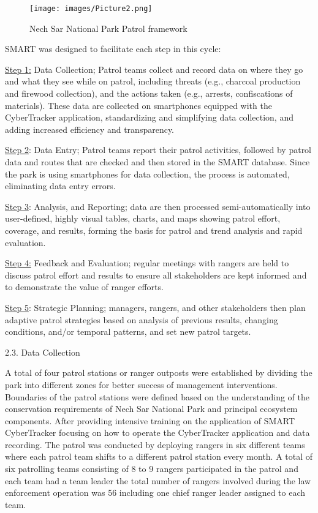 \documentclass[
  letterpaper,
  DIV=11,
  numbers=noendperiod]{scrartcl}
\begin{document}
\begin{figure}[H]

{\centering \texttt{[image: images/Picture2.png]}

}

\caption{Nech Sar National Park Patrol framework}

\end{figure}%

SMART was designed to facilitate each step in this cycle:~

\ul{Step 1:} Data Collection; Patrol teams collect and record data on
where they go and what they see while on patrol, including threats
(e.g., charcoal production and firewood collection), and the actions
taken (e.g., arrests, confiscations of materials). These data are
collected on smartphones equipped with the CyberTracker application,
standardizing and simplifying data collection, and adding increased
efficiency and transparency.~

\ul{Step 2}: Data Entry; Patrol teams report their patrol activities,
followed by patrol data and routes that are checked and then stored in
the SMART database. Since the park is using smartphones for data
collection, the process is automated, eliminating data entry errors.

\ul{Step 3}: Analysis, and Reporting; data are then processed
semi-automatically into user-defined, highly visual tables, charts, and
maps showing patrol effort, coverage, and results, forming the basis for
patrol and trend analysis and rapid evaluation.

\ul{Step 4:} Feedback and Evaluation; regular meetings with rangers are
held to discuss patrol effort and results to ensure all stakeholders are
kept informed and to demonstrate the value of ranger efforts.

\ul{Step 5}: Strategic Planning; managers, rangers, and other
stakeholders then plan adaptive patrol strategies based on analysis of
previous results, changing conditions, and/or temporal patterns, and set
new patrol targets.

2.3. Data Collection

A total of four patrol stations or ranger outposts were established by
dividing the park into different zones for better success of management
interventions. Boundaries of the patrol stations were defined based on
the understanding of the conservation requirements of Nech Sar National
Park and principal ecosystem components. After providing intensive
training on the application of SMART CyberTracker focusing on how to
operate the CyberTracker application and data recording. The patrol was
conducted by deploying rangers in six different teams where each patrol
team shifts to a different patrol station every month. A total of six
patrolling teams consisting of 8 to 9 rangers participated in the patrol
and each team had a team leader the total number of rangers involved
during the law enforcement operation was 56 including one chief ranger
leader assigned to each team.
\end{document}
